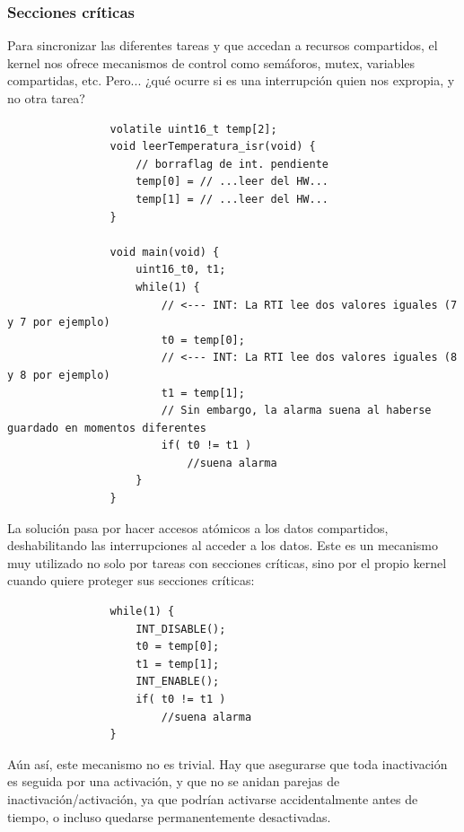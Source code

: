 \documentclass[../main.tex]{subfiles}
\begin{document}
        \subsubsection{Secciones críticas}

            Para sincronizar las diferentes tareas y que accedan a recursos compartidos, el kernel nos ofrece mecanismos de control como semáforos, mutex, variables compartidas, etc. Pero... ¿qué ocurre si es una interrupción quien nos expropia, y no otra tarea?

            \begin{lstlisting}
                volatile uint16_t temp[2]; 
                void leerTemperatura_isr(void) { 
                    // borraflag de int. pendiente
                    temp[0] = // ...leer del HW... 
                    temp[1] = // ...leer del HW... 
                } 
                
                void main(void) { 
                    uint16_t0, t1; 
                    while(1) { 
                        // <--- INT: La RTI lee dos valores iguales (7 y 7 por ejemplo)
                        t0 = temp[0]; 
                        // <--- INT: La RTI lee dos valores iguales (8 y 8 por ejemplo)
                        t1 = temp[1]; 
                        // Sin embargo, la alarma suena al haberse guardado en momentos diferentes
                        if( t0 != t1 ) 
                            //suena alarma
                    } 
                }
            \end{lstlisting}

            La solución pasa por hacer accesos atómicos a los datos compartidos, deshabilitando las interrupciones al acceder a los datos. Este es un mecanismo muy utilizado no solo por tareas con secciones críticas, sino por el propio kernel cuando quiere proteger sus secciones críticas:

            \begin{lstlisting}
                while(1) { 
                    INT_DISABLE();
                    t0 = temp[0]; 
                    t1 = temp[1]; 
                    INT_ENABLE();
                    if( t0 != t1 ) 
                        //suena alarma
                } 
            \end{lstlisting}

            Aún así, este mecanismo no es trivial. Hay que asegurarse que toda inactivación es seguida por una activación, y que no se anidan parejas de inactivación/activación, ya que podrían activarse accidentalmente antes de tiempo, o incluso quedarse permanentemente desactivadas.
\end{document}
